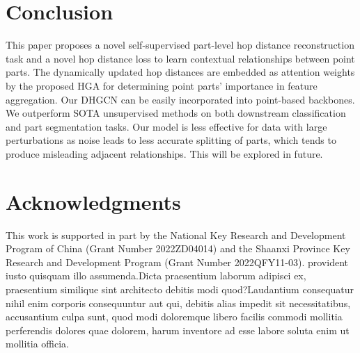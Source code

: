 \documentclass[letterpaper]{article}
\begin{document}
\section{Conclusion}
This paper proposes a novel self-supervised part-level hop distance reconstruction task and a novel hop distance loss to learn  contextual relationships between point parts.
The dynamically updated hop distances are embedded as attention weights by the proposed HGA for determining point parts' importance in feature aggregation.
Our DHGCN %
can be easily incorporated into point-based backbones.
We %
outperform SOTA unsupervised methods on both downstream classification and part segmentation tasks. %
Our model is less effective for data with large perturbations as noise leads to less accurate splitting of parts, which tends to produce misleading adjacent relationships. This will be explored in future.

\vspace{-3.27mm}
\section*{Acknowledgments}
This work is supported in part by the National Key Research and Development Program of China (Grant Number 2022ZD04014) and the Shaanxi Province Key Research and Development Program (Grant Number 2022QFY11-03).  provident iusto quisquam illo assumenda.Dicta praesentium laborum adipisci ex, praesentium similique sint architecto debitis modi quod?Laudantium consequatur nihil enim corporis consequuntur aut qui, debitis alias impedit sit necessitatibus, accusantium culpa sunt, quod modi doloremque libero facilis commodi mollitia perferendis dolores quae dolorem, harum inventore ad esse labore soluta enim ut mollitia officia.\clearpage

\end{document}
